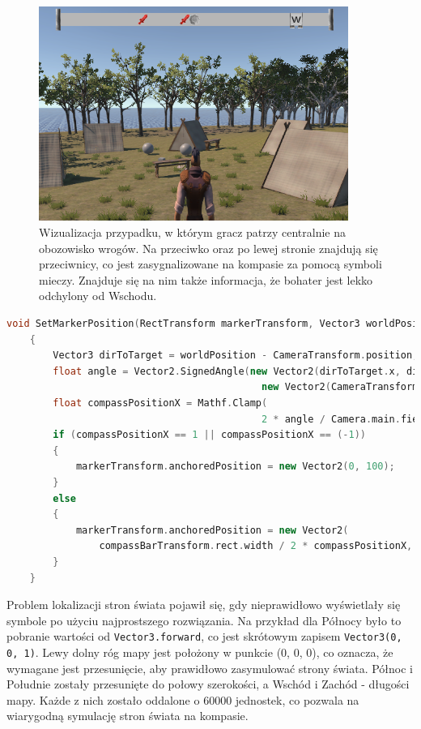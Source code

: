 \begin{figure}[htbp]
    \centering
    \includegraphics[width=0.9\textwidth]{images/ui/compass.png}
    \caption{Wizualizacja przypadku, w którym gracz patrzy centralnie na obozowisko wrogów. Na przeciwko oraz po lewej stronie znajdują się przeciwnicy, co jest zasygnalizowane na kompasie za pomocą symboli mieczy. Znajduje się na nim także informacja, że bohater jest lekko odchylony od Wschodu.
    }\label{fig:compass}
\end{figure}
\FloatBarrier
    \begin{lstlisting}[language=C++, caption=Fragment kodu odpowiedzialny za ustawienie symbolu na pasku kompasu.]
    void SetMarkerPosition(RectTransform markerTransform, Vector3 worldPosition)
    {
        Vector3 dirToTarget = worldPosition - CameraTransform.position;
        float angle = Vector2.SignedAngle(new Vector2(dirToTarget.x, dirToTarget.z), 
                                            new Vector2(CameraTransform.transform.forward.x, CameraTransform.transform.forward.z));
        float compassPositionX = Mathf.Clamp(
                                            2 * angle / Camera.main.fieldOfView, -1, 1);
        if (compassPositionX == 1 || compassPositionX == (-1))
        {
            markerTransform.anchoredPosition = new Vector2(0, 100);
        }
        else
        {
            markerTransform.anchoredPosition = new Vector2(
                compassBarTransform.rect.width / 2 * compassPositionX, 0);
        }
    }
    \end{lstlisting}
\FloatBarrier
Problem lokalizacji stron świata pojawił się, gdy nieprawidłowo wyświetlały się symbole po użyciu najprostszego rozwiązania. Na przykład dla Północy było to
pobranie wartości od \texttt{Vector3.forward}, co jest skrótowym zapisem \texttt{Vector3(0, 0, 1)}. Lewy dolny róg mapy jest położony w punkcie (0, 0, 0), co oznacza, że wymagane
jest przesunięcie, aby prawidłowo zasymulować strony świata. Północ i Południe  zostały przesunięte do połowy szerokości, a Wschód i Zachód - długości mapy. Każde z nich
zostało oddalone o 60000 jednostek, co pozwala na wiarygodną symulację stron świata na kompasie.

